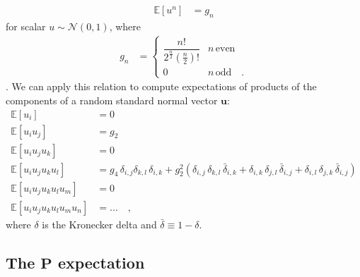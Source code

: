 \documentclass[modern]{aastex62}
\begin{document}
%
\begin{align}
    \mathbb{E}\left[ u^n \right] & = g_n
\end{align}
%
for scalar $u \sim \mathcal{N}(0, 1)$, where
%
\begin{align}
    g_n
     & =
    \begin{cases}
        \dfrac{n!}{2^\frac{n}{2} \left(\frac{n}{2}\right)!} & n \, \mathrm{even}
        \\
        0                                                   & n \, \mathrm{odd}
        \quad.
    \end{cases}
\end{align}
%
\citep[e.g.,][]{Winkelbauer2012}.
We can apply this relation to compute expectations
of products of the components of a random standard normal vector $\mathbf{u}$:
%
\begin{align}
    \mathbb{E}\left[u_i \right]                    & = 0
    \\[1em]
    \mathbb{E}\left[u_i u_j\right]                 & = g_2
    \\[1em]
    \mathbb{E}\left[u_i u_j u_k\right]             & = 0
    \\[1em]
    \mathbb{E}\left[u_i u_j u_k u_l\right]         & =
    g_4 \, \delta_{i, j} \delta_{k, l} \, \delta_{i, k}
    +
    g_2^2 \left(
    \delta_{i, j} \, \delta_{k, l} \, \bar{\delta}_{i, k}
    +
    \delta_{i, k} \, \delta_{j, l} \, \bar{\delta}_{i, j}
    +
    \delta_{i, l} \, \delta_{j, k} \, \bar{\delta}_{i, j}
    \right)
    \\[1em]
    \mathbb{E}\left[u_i u_j u_k u_l u_m\right]     & = 0
    \\[1em]
    \mathbb{E}\left[u_i u_j u_k u_l u_m u_n\right] & =
    ...
    \quad,
\end{align}
%
where $\delta$ is the Kronecker delta and $\bar{\delta} \equiv 1 - \delta$.

\subsection{The $\mathbf{P}$ expectation}
\end{document}
